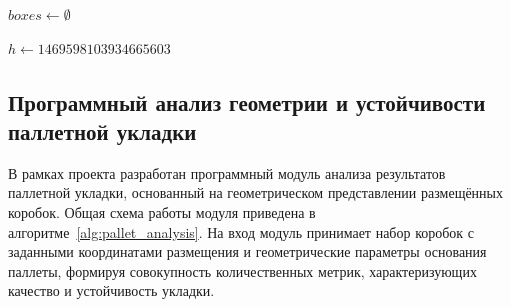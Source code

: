 \begin{algorithm}[H]
\caption{Reconstruct boxes from a pallet placement}
\label{alg:reverse_reconstruct}

$boxes \leftarrow \emptyset$\;


\;
\end{algorithm}



\begin{algorithm}[H]
\caption{Hash computation for a composite key}
\label{alg:reverse_key_hash}
$h \leftarrow 1469598103934665603$\;
\;
\end{algorithm}

\subsection{Программный анализ геометрии и устойчивости паллетной укладки}

В рамках проекта разработан программный модуль анализа результатов паллетной укладки, основанный на геометрическом представлении размещённых коробок. Общая схема работы модуля приведена в алгоритме~\ref{alg:pallet_analysis}. На вход модуль принимает набор коробок с заданными координатами размещения и геометрические параметры основания паллеты, формируя совокупность количественных метрик, характеризующих качество и устойчивость укладки.

